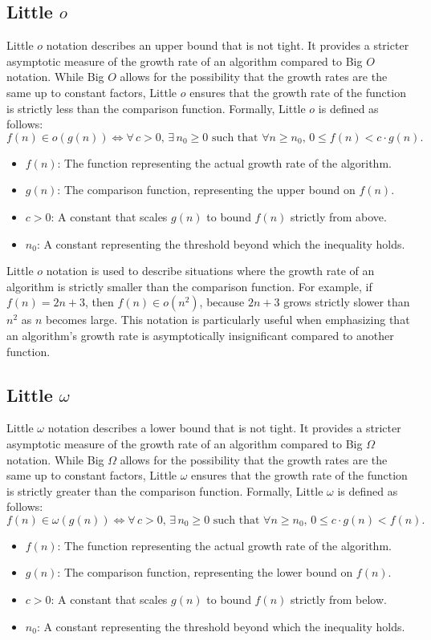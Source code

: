 \subsection{Little $o$}
Little $o$ notation describes an upper bound that is not tight. 
It provides a stricter asymptotic measure of the growth rate 
of an algorithm compared to Big $O$ notation. While Big $O$ 
allows for the possibility that the growth rates are the same 
up to constant factors, Little $o$ ensures that the growth rate 
of the function is strictly less than the comparison function. 
Formally, Little $o$ is defined as follows:
\[
f(n) \in o(g(n)) \iff \forall \, c > 0, \, \exists \, n_0 \geq 0 \text{ such that } \forall n \geq n_0, \, 0 \leq f(n) < c \cdot g(n).
\]
\begin{itemize}
    \item $f(n)$: The function representing the actual growth rate of the algorithm.
    \item $g(n)$: The comparison function, representing the upper bound on $f(n)$.
    \item $c > 0$: A constant that scales $g(n)$ to bound $f(n)$ strictly from above.
    \item $n_0$: A constant representing the threshold beyond which the inequality holds.
\end{itemize}

Little $o$ notation is used to describe situations where the growth rate 
of an algorithm is strictly smaller than the comparison function. For example, 
if $f(n) = 2n + 3$, then $f(n) \in o(n^2)$, because $2n + 3$ grows strictly 
slower than $n^2$ as $n$ becomes large. This notation is particularly useful 
when emphasizing that an algorithm's growth rate is asymptotically insignificant 
compared to another function.

\subsection{Little $\omega$}
Little $\omega$ notation describes a lower bound that is not tight. 
It provides a stricter asymptotic measure of the growth rate 
of an algorithm compared to Big $\Omega$ notation. While Big $\Omega$ 
allows for the possibility that the growth rates are the same 
up to constant factors, Little $\omega$ ensures that the growth rate 
of the function is strictly greater than the comparison function. 
Formally, Little $\omega$ is defined as follows:
\[
f(n) \in \omega(g(n)) \iff \forall \, c > 0, \, \exists \, n_0 \geq 0 \text{ such that } \forall n \geq n_0, \, 0 \leq c \cdot g(n) < f(n).
\]
\begin{itemize}
    \item $f(n)$: The function representing the actual growth rate of the algorithm.
    \item $g(n)$: The comparison function, representing the lower bound on $f(n)$.
    \item $c > 0$: A constant that scales $g(n)$ to bound $f(n)$ strictly from below.
    \item $n_0$: A constant representing the threshold beyond which the inequality holds.
\end{itemize}

